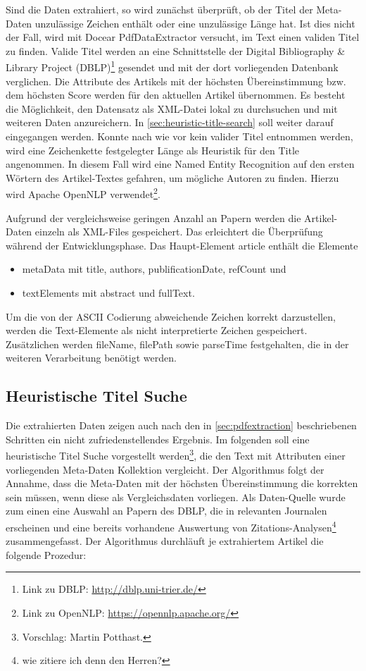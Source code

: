Sind die Daten extrahiert, so wird zunächst überprüft, ob der Titel der
Meta-Daten unzulässige Zeichen enthält oder eine unzulässige Länge
hat. Ist dies nicht der Fall, wird mit Docear PdfDataExtractor
versucht, im Text einen validen Titel zu finden. Valide Titel
werden an eine Schnittstelle der Digital Bibliography \& Library
Project (DBLP)\footnote{Link zu DBLP: \url{http://dblp.uni-trier.de/}}
gesendet und mit der dort vorliegenden Datenbank verglichen. Die Attribute des Artikels mit
der höchsten Übereinstimmung bzw. dem höchsten Score werden für den aktuellen
Artikel übernommen. Es besteht die Möglichkeit, den Datensatz als
XML-Datei lokal zu durchsuchen und mit weiteren Daten anzureichern.
In \autoref{sec:heuristic-title-search} soll weiter darauf
eingegangen werden.
Konnte nach wie vor kein valider Titel entnommen
werden, wird eine Zeichenkette festgelegter Länge als Heuristik für
den Title angenommen. In diesem Fall wird eine Named Entity
Recognition auf den ersten Wörtern des Artikel-Textes gefahren, um mögliche
Autoren zu finden. Hierzu wird Apache OpenNLP verwendet\footnote{Link zu
  OpenNLP: \url{https://opennlp.apache.org/}}.

Aufgrund der vergleichsweise geringen Anzahl an Papern werden die
Artikel-Daten einzeln als XML-Files gespeichert. Das erleichtert die
Überprüfung während der Entwicklungsphase. Das Haupt-Element
article enthält die Elemente 
\begin{itemize}
\item metaData mit title, authors, publificationDate, refCount und
\item textElements mit abstract und fullText. 
\end{itemize}

Um die von der ASCII Codierung abweichende Zeichen korrekt darzustellen,
werden die Text-Elemente  als nicht interpretierte Zeichen gespeichert.
Zusätzlichen werden fileName, filePath sowie parseTime festgehalten,
die in der weiteren Verarbeitung benötigt werden. 

\subsection{Heuristische Titel Suche}\label{sec:heuristic-title-search}

Die extrahierten Daten zeigen auch nach den in \autoref{sec:pdfextraction}
beschriebenen Schritten ein nicht zufriedenstellendes Ergebnis. Im folgenden soll eine heuristische
Titel Suche vorgestellt werden\footnote{Vorschlag: Martin Potthast.}, die den Text mit Attributen einer
vorliegenden Meta-Daten Kollektion vergleicht. Der Algorithmus
folgt der Annahme, dass die Meta-Daten mit der höchsten Übereinstimmung
die korrekten sein müssen, wenn diese als Vergleichsdaten
vorliegen. Als Daten-Quelle wurde zum einen eine Auswahl an Papern des DBLP, die in relevanten Journalen erscheinen und eine bereits vorhandene Auswertung von
Zitations-Analysen\footnote{wie zitiere ich denn den Herren?}
zusammengefasst. Der Algorithmus durchläuft je extrahiertem 
Artikel die folgende Prozedur:

